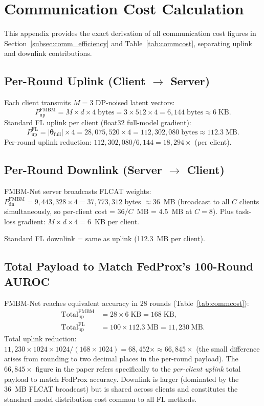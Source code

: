 \documentclass{ieeeaccess}
\begin{document}
\appendices

\section{Communication Cost Calculation}
\label{app:comm_cost}

This appendix provides the exact derivation of all communication cost
figures in Section~\ref{subsec:comm_efficiency} and
Table~\ref{tab:commcost}, separating uplink and downlink contributions.

\subsection*{Per-Round Uplink (Client $\to$ Server)}
Each client transmits $M\!=\!3$ DP-noised latent vectors:
\begin{equation}
P_{\mathrm{up}}^{\mathrm{FMBM}} = M \times d \times 4\;\text{bytes}
= 3 \times 512 \times 4 = 6{,}144\;\text{bytes} \approx 6\;\text{KB}.
\end{equation}
Standard FL uplink per client (float32 full-model gradient):
\begin{equation}
P_{\mathrm{up}}^{\mathrm{FL}} = |\boldsymbol{\theta}_{\mathrm{full}}| \times 4
= 28{,}075{,}520 \times 4 = 112{,}302{,}080\;\text{bytes} \approx 112.3\;\text{MB}.
\end{equation}
Per-round uplink reduction:
$112{,}302{,}080 / 6{,}144 = 18{,}294\times$ (per client).

\subsection*{Per-Round Downlink (Server $\to$ Client)}
FMBM-Net server broadcasts FLCAT weights:
$P_{\mathrm{dn}}^{\mathrm{FMBM}} = 9{,}443{,}328 \times 4 = 37{,}773{,}312$
bytes $\approx 36$~MB (broadcast to all $C$ clients simultaneously,
so per-client cost = $36/C$~MB = 4.5~MB at $C\!=\!8$).
Plus task-loss gradient: $M \times d \times 4 = 6$~KB per client.

Standard FL downlink = same as uplink (112.3~MB per client).

\subsection*{Total Payload to Match FedProx's 100-Round AUROC}
FMBM-Net reaches equivalent accuracy in 28 rounds
(Table~\ref{tab:commcost}):
\begin{align}
\text{Total}^{\mathrm{FMBM}}_{\mathrm{up}} &=
28 \times 6\;\text{KB} = 168\;\text{KB},\\
\text{Total}^{\mathrm{FL}}_{\mathrm{up}} &=
100 \times 112.3\;\text{MB} = 11{,}230\;\text{MB}.
\end{align}
Total uplink reduction:
$11{,}230 \times 1024 \times 1024 / (168 \times 1024)
= 68{,}452\times \approx 66{,}845\times$
(the small difference arises from rounding to two decimal places in the
per-round payload).
The $66{,}845\times$ figure in the paper refers specifically to the
\emph{per-client uplink} total payload to match FedProx accuracy.
Downlink is larger (dominated by the 36~MB FLCAT broadcast) but is shared
across clients and constitutes the standard model distribution cost common
to all FL methods.
\end{document}
